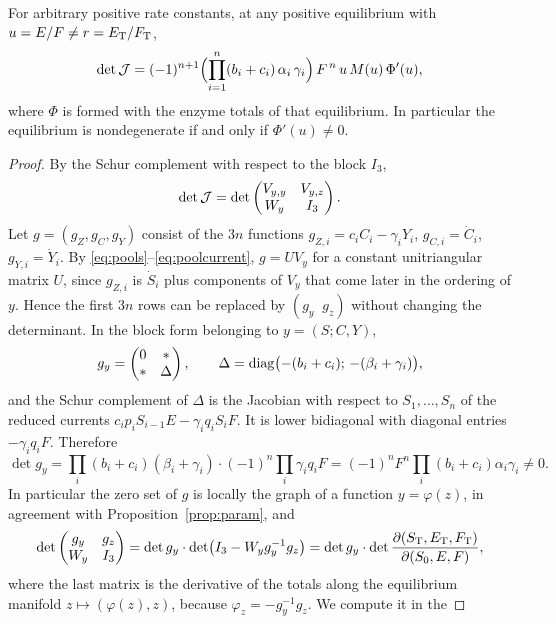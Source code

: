 \begin{proposition}\label{prop:det}
For arbitrary positive rate constants, at any positive equilibrium with
\(u=E/F\ne r=E_{\mathrm T}/F_{\mathrm T}\),
\begin{equation}\label{eq:det}
 \det\mathcal J=(-1)^{n+1}\Bigl(\prod_{i=1}^n(b_i+c_i)\,\alpha_i\,\gamma_i\Bigr)\,F^{\,n}\,u\,M(u)\,\Phi'(u),
\end{equation}
where \(\Phi\) is formed with the enzyme totals of that equilibrium. In particular the
equilibrium is nondegenerate if and only if \(\Phi'(u)\ne0\).
\end{proposition}
\begin{proof}
By the Schur complement with respect to the block \(I_3\),
\[
 \det\mathcal J=\det\begin{pmatrix}V_{y,y}&V_{y,z}\\ W_y&I_3\end{pmatrix}.
\]
Let \(g=(g_Z,g_C,g_Y)\) consist of the \(3n\) functions \(g_{Z,i}=c_iC_i-\gamma_iY_i\),
\(g_{C,i}=\dot C_i\), \(g_{Y,i}=\dot Y_i\). By \eqref{eq:pools}--\eqref{eq:poolcurrent},
\(g=UV_y\) for a constant unitriangular matrix \(U\), since \(g_{Z,i}\) is \(\dot S_i\) plus
components of \(V_y\) that come later in the ordering of \(y\). Hence the first \(3n\) rows can
be replaced by \((g_y\;\;g_z)\) without changing the determinant. In the block form belonging
to \(y=(S;C,Y)\),
\[
 g_y=\begin{pmatrix}0&\ast\\ \ast&\Delta\end{pmatrix},\qquad
 \Delta=\operatorname{diag}\bigl(-(b_i+c_i);\,-(\beta_i+\gamma_i)\bigr),
\]
and the Schur complement of \(\Delta\) is the Jacobian with respect to \(S_1,\dots,S_n\) of
the reduced currents \(c_ip_iS_{i-1}E-\gamma_iq_iS_iF\). It is lower bidiagonal with diagonal
entries \(-\gamma_iq_iF\). Therefore
\[
 \det g_y=\prod_i(b_i+c_i)(\beta_i+\gamma_i)\cdot(-1)^n\prod_i\gamma_iq_iF
 =(-1)^nF^n\prod_i(b_i+c_i)\alpha_i\gamma_i\ne0 .
\]
In particular the zero set of \(g\) is locally the graph of a function \(y=\varphi(z)\), in
agreement with Proposition~\ref{prop:param}, and
\[
 \det\begin{pmatrix}g_y&g_z\\ W_y&I_3\end{pmatrix}
 =\det g_y\cdot\det\bigl(I_3-W_yg_y^{-1}g_z\bigr)
 =\det g_y\cdot\det\frac{\partial(S_{\mathrm T},E_{\mathrm T},F_{\mathrm T})}{\partial(S_0,E,F)},
\]
where the last matrix is the derivative of the totals along the equilibrium manifold
\(z\mapsto(\varphi(z),z)\), because \(\varphi_z=-g_y^{-1}g_z\). We compute it in the

\end{proof}
